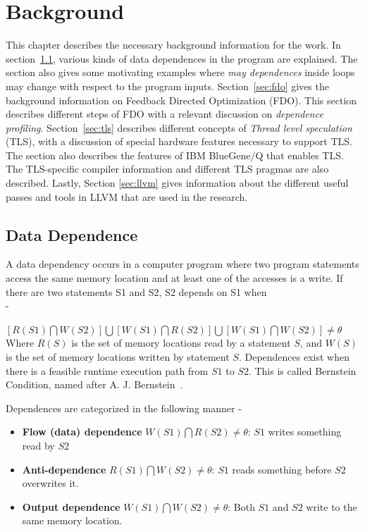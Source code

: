 \documentclass[10pt]{report}          %
\begin{document}
\chapter{Background}
\label{chapter:background}
This chapter describes the necessary background information for the work. In section~\ref{sec:data_dependence}, various kinds of data dependences in the program are explained.  The section also gives some motivating examples where \textit{may dependences} inside loops may change with respect to the program inputs.  Section~\ref{sec:fdo} gives the background information on Feedback Directed Optimization (FDO).  This section describes different steps of FDO with a relevant discussion on \textit{dependence profiling}.  Section~\ref{sec:tls} describes different concepts of \textit{Thread level speculation} (TLS), with  a discussion of special hardware features necessary to support TLS.  The section also describes the features of IBM BlueGene/Q that enables TLS.  The TLS-specific compiler information and different TLS pragmas are also described.  Lastly, Section \ref{sec:llvm} gives information about the different useful passes and tools in LLVM that are used in the research.

\section{Data Dependence}
\label{sec:data_dependence}
A data dependency occurs in a computer program where two program statements access the same memory location  and at least one of the accesses is a write.  If there are two statements S1 and S2, S2 depends on S1 when \\- 

$[R(S1) \bigcap W(S2)] \bigcup  [W(S1) \bigcap R(S2)] \bigcup [W(S1) \bigcap W(S2)] \neq \theta $\\

Where $R(S)$ is the set of memory locations read by a statement $S$, and $W(S)$ is the set of memory locations written by statement $S$.  Dependences exist when there is a feasible runtime execution path from $S1$ to $S2$.  This is called Bernstein Condition, named after A. J. Bernstein~\cite{bernstein}.

Dependences are categorized in the following manner - 

\begin{itemize}
\item \textbf{Flow (data) dependence} $W(S1) \bigcap R(S2) \neq \theta $:  $S1$ writes something read by $S2$
\item \textbf{Anti-dependence} $R(S1) \bigcap W(S2) \neq \theta $: $S1$ reads something before $S2$ overwrites it.
\item \textbf{Output dependence} $W(S1) \bigcap W(S2) \neq \theta$: Both $S1$ and $S2$ write to the same memory location.
\end{itemize}
\end{document}
